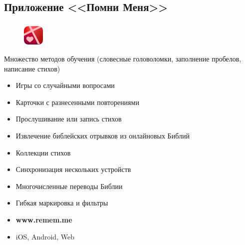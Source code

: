 \documentclass[t,aspectratio=169]{beamer}  %
\begin{document}
\subsection{Приложение <<Помни Меня>>}
\begin{frame}[c]
	\frametitle{\insertsection}
	\framesubtitle{\insertsubsection}
	\begin{figure}
		\begin{flushright}
		\vspace{-1.5cm}
		\includegraphics[width=1cm]{remember-me-logo}
	\end{flushright}
		\end{figure}
		\vspace{-0.2cm}

	 \begin{multicols}{2}
		Множество методов обучения (словесные головоломки, заполнение пробелов, написание стихов)
		\begin{itemize}

			\item Игры со случайными вопросами
			\item Карточки с разнесенными повторениями
			\item Прослушивание или запись стихов
			\item Извлечение библейских отрывков из онлайновых Библий
			\item Коллекции стихов
			\item Синхронизация нескольких устройств
			\item Многочисленные переводы Библии
			\item Гибкая маркировка и фильтры
			\item \textbf{www.remem.me}
			\item iOS, Android, Web
		\end{itemize}
		\columnbreak
		\begin{center}
			\begin{figure}
			

\end{figure}
\end{center}
\end{multicols}
\end{frame}
\end{document}
